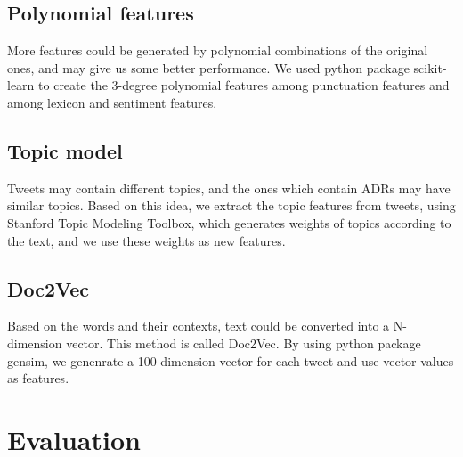 \documentclass[11pt]{article}
\begin{document}
\subsection{Polynomial features}
More features could be generated
by polynomial combinations of the original ones,
and may give us some better performance.
We used python package scikit-learn\cite{scikit-learn}
to create the 3-degree polynomial features among punctuation features
and among lexicon and sentiment features.

\subsection{Topic model}
Tweets may contain different topics,
and the ones which contain ADRs may have similar topics.
Based on this idea, we extract the topic features from tweets,
using Stanford Topic Modeling Toolbox\cite{ramage-tmt},
which generates weights of topics according to the text,
and we use these weights as new features.




\subsection{Doc2Vec}
Based on the words and their contexts,
text could be converted into a N-dimension vector.
This method is called Doc2Vec.
By using python package gensim\cite{rehurek_lrec},
we genenrate a 100-dimension vector for each tweet
and use vector values as features.

\section{Evaluation}
\addtocounter{footnote}{1}
\addtocounter{footnote}{-1}
\end{document}
